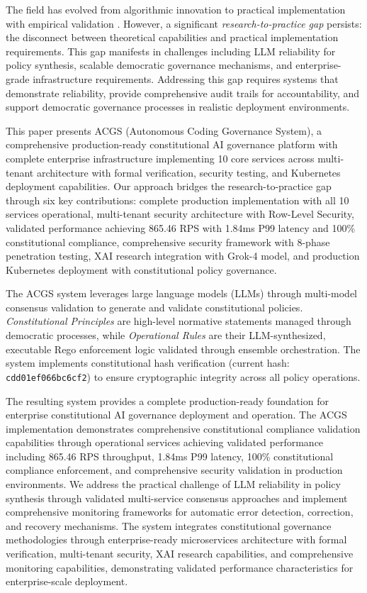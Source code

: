 \documentclass[manuscript,screen,9pt]{acmart}
\begin{document}
The field has evolved from algorithmic innovation to practical implementation with empirical validation \cite{StanfordJBLP2024AIGovernanceWeb3, StanfordLaw2025BulletProof}. However, a significant \textit{research-to-practice gap} persists: the disconnect between theoretical capabilities and practical implementation requirements. This gap manifests in challenges including LLM reliability for policy synthesis, scalable democratic governance mechanisms, and enterprise-grade infrastructure requirements. Addressing this gap requires systems that demonstrate reliability, provide comprehensive audit trails for accountability, and support democratic governance processes in realistic deployment environments.

This paper presents ACGS (Autonomous Coding Governance System), a comprehensive production-ready constitutional AI governance platform with complete enterprise infrastructure implementing 10 core services across multi-tenant architecture with formal verification, security testing, and Kubernetes deployment capabilities. Our approach bridges the research-to-practice gap through six key contributions: complete production implementation with all 10 services operational, multi-tenant security architecture with Row-Level Security, validated performance achieving 865.46 RPS with 1.84ms P99 latency and 100\% constitutional compliance, comprehensive security framework with 8-phase penetration testing, XAI research integration with Grok-4 model, and production Kubernetes deployment with constitutional policy governance.

The ACGS system leverages large language models (LLMs) through multi-model consensus validation to generate and validate constitutional policies. \textit{Constitutional Principles} are high-level normative statements managed through democratic processes, while \textit{Operational Rules} are their LLM-synthesized, executable Rego enforcement logic validated through ensemble orchestration. The system implements constitutional hash verification (current hash: \texttt{\small{cdd01ef066bc6cf2}}) to ensure cryptographic integrity across all policy operations.

The resulting system provides a complete production-ready foundation for enterprise constitutional AI governance deployment and operation. The ACGS implementation demonstrates comprehensive constitutional compliance validation capabilities through operational services achieving validated performance including 865.46 RPS throughput, 1.84ms P99 latency, 100\% constitutional compliance enforcement, and comprehensive security validation in production environments. We address the practical challenge of LLM reliability in policy synthesis through validated multi-service consensus approaches and implement comprehensive monitoring frameworks for automatic error detection, correction, and recovery mechanisms. The system integrates constitutional governance methodologies through enterprise-ready microservices architecture with formal verification, multi-tenant security, XAI research capabilities, and comprehensive monitoring capabilities, demonstrating validated performance characteristics for enterprise-scale deployment.
\end{document}
